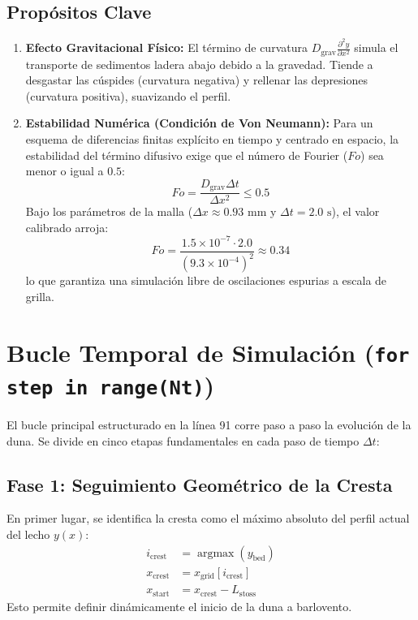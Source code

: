 \documentclass[11pt,a4paper]{article}
\begin{document}
\subsection{Propósitos Clave}
\begin{enumerate}
    \item \textbf{Efecto Gravitacional Físico:} El término de curvatura $D_{\text{grav}} \frac{\partial^2 y}{\partial x^2}$ simula el transporte de sedimentos ladera abajo debido a la gravedad. Tiende a desgastar las cúspides (curvatura negativa) y rellenar las depresiones (curvatura positiva), suavizando el perfil.
    \item \textbf{Estabilidad Numérica (Condición de Von Neumann):} Para un esquema de diferencias finitas explícito en tiempo y centrado en espacio, la estabilidad del término difusivo exige que el número de Fourier ($Fo$) sea menor o igual a $0.5$:
    \begin{equation}
        Fo = \frac{D_{\text{grav}} \Delta t}{\Delta x^2} \le 0.5
    \end{equation}
    Bajo los parámetros de la malla ($\Delta x \approx 0.93\text{ mm}$ y $\Delta t = 2.0\text{ s}$), el valor calibrado arroja:
    \begin{equation}
        Fo = \frac{1.5 \times 10^{-7} \cdot 2.0}{(9.3 \times 10^{-4})^2} \approx 0.34
    \end{equation}
    lo que garantiza una simulación libre de oscilaciones espurias a escala de grilla.
\end{enumerate}

\section{Bucle Temporal de Simulación (\texttt{for step in range(Nt)})}
El bucle principal estructurado en la línea 91 corre paso a paso la evolución de la duna. Se divide en cinco etapas fundamentales en cada paso de tiempo $\Delta t$:

\subsection{Fase 1: Seguimiento Geométrico de la Cresta}
En primer lugar, se identifica la cresta como el máximo absoluto del perfil actual del lecho $y(x)$:
\begin{align}
    i_{\text{crest}} &= \operatorname{argmax}(y_{\text{bed}}) \\
    x_{\text{crest}} &= x_{\text{grid}}[i_{\text{crest}}] \\
    x_{\text{start}} &= x_{\text{crest}} - L_{\text{stoss}}
\end{align}
Esto permite definir dinámicamente el inicio de la duna a barlovento.
\end{document}
